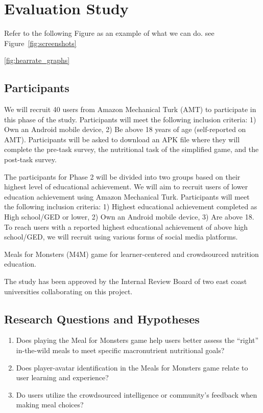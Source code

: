\section{Evaluation Study}

Refer to the following Figure as an example of what we can do. see Figure~\ref{fig:screenshots}

\ref{fig:hearrate_graphs}

\subsection{Participants}
We will recruit 40 users from Amazon Mechanical Turk (AMT) to participate in this phase of the study. Participants will meet the following inclusion criteria: 1) Own an Android mobile device, 2) Be above 18 years of age (self-reported on AMT).
Participants will be asked to download an APK file where they will complete the pre-task survey, the nutritional task of the simplified game, and the post-task survey. 

The participants for Phase 2 will be divided into two groups based on their highest level of educational achievement. We will aim to recruit users of lower education achievement using Amazon Mechanical Turk. Participants will meet the following inclusion criteria: 1) Highest educational achievement completed as High school/GED or lower, 2) Own an Android mobile device, 3) Are above 18. 
To reach users with a reported highest educational achievement of above high school/GED, we will recruit using various forms of social media platforms.

Meals for Monsters (M4M) game for learner-centered and crowdsourced nutrition education.

The study has been approved by the Internal Review Board of two east coast universities collaborating on this project.

\subsection{Research Questions and Hypotheses}

\begin{enumerate}
    \item Does playing the Meal for Monsters game help users better assess the ``right'' in-the-wild meals to meet specific macronutrient nutritional goals?
    \item Does player-avatar identification in the Meals for Monsters game relate to user learning and experience?
    \item Do users utilize the crowdsourced intelligence or community's feedback when making meal choices?
\end{enumerate}

